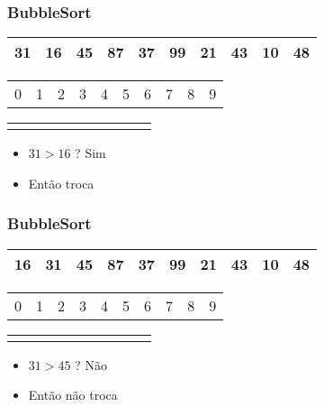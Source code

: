 \documentclass{beamer}
\begin{document}
\begin{frame}
    \frametitle{BubbleSort}
    \begin{center}
        \begin{table}
            \begin{tabular}{| p{0.25cm} | p{0.25cm} | p{0.25cm} | p{0.25cm} | p{0.25cm} | p{0.25cm} | p{0.25cm} | p{0.25cm} | p{0.25cm} | p{0.25cm} |}
                \hline
                31 & 16 & 45 & 87 & 37 & 99 & 21 & 43 & 10 & 48 \\ \hline
            \end{tabular}
            \begin{tabular}{p{0.25cm} p{0.25cm} p{0.25cm} p{0.25cm} p{0.25cm} p{0.25cm} p{0.25cm} p{0.25cm} p{0.25cm} p{0.25cm}}
                0 & 1 & 2 & 3 & 4 & 5 & 6 & 7 & 8 & 9
            \end{tabular}
            \begin{tabular}{p{0.25cm} p{0.25cm} p{0.25cm} p{0.25cm} p{0.25cm} p{0.25cm} p{0.25cm} p{0.25cm} p{0.25cm} p{0.25cm}}
                \color{red}{$\uparrow$} & \color{blue}{$\uparrow$} & & & & & & & &
            \end{tabular}
        \end{table}
	\end{center}
    \begin{itemize}[<+->]
        \item $31 > 16$ ? Sim
        \item Então troca
    \end{itemize}
\end{frame}

\begin{frame}
    \frametitle{BubbleSort}
    \begin{center}
        \begin{table}
            \begin{tabular}{| p{0.25cm} | p{0.25cm} | p{0.25cm} | p{0.25cm} | p{0.25cm} | p{0.25cm} | p{0.25cm} | p{0.25cm} | p{0.25cm} | p{0.25cm} |}
                \hline
                16 & 31 & 45 & 87 & 37 & 99 & 21 & 43 & 10 & 48 \\ \hline
            \end{tabular}
            \begin{tabular}{p{0.25cm} p{0.25cm} p{0.25cm} p{0.25cm} p{0.25cm} p{0.25cm} p{0.25cm} p{0.25cm} p{0.25cm} p{0.25cm}}
                0 & 1 & 2 & 3 & 4 & 5 & 6 & 7 & 8 & 9
            \end{tabular}
            \begin{tabular}{p{0.25cm} p{0.25cm} p{0.25cm} p{0.25cm} p{0.25cm} p{0.25cm} p{0.25cm} p{0.25cm} p{0.25cm} p{0.25cm}}
                & \color{blue}{$\uparrow$} & \color{red}{$\uparrow$} & & & & & & &
            \end{tabular}
        \end{table}
	\end{center}
    \begin{itemize}[<+->]
        \item $31 > 45$ ? Não
        \item Então não troca
    \end{itemize}
\end{frame}
\end{document}

